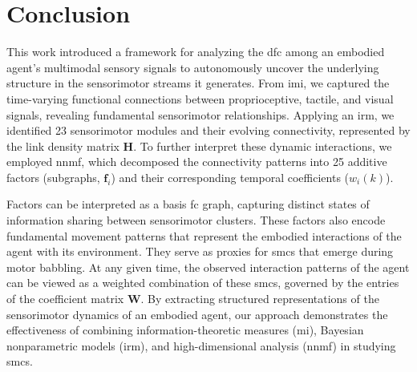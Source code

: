 \documentclass[letterpaper, 10 pt, conference]{ieeeconf}  %
\begin{document}
\section{Conclusion}
This work introduced a framework for analyzing the \acl{dfc} among an embodied agent's multimodal sensory signals to autonomously uncover the underlying structure in the sensorimotor streams it generates. 
From \acl{imi}, we captured the time-varying functional connections between proprioceptive, tactile, and visual signals, revealing fundamental sensorimotor relationships. 
Applying an \acl{irm}, we identified 23 sensorimotor modules and their evolving connectivity, represented by the link density matrix $\bm{H}$. 
To further interpret these dynamic interactions, we employed \acl{nnmf}, which decomposed the connectivity patterns into 25 additive factors (subgraphs, $\bm{f}_i$) and their corresponding temporal coefficients ($w_i(k)$).

Factors can be interpreted as a basis \ac{fc} graph, capturing distinct states of information sharing between sensorimotor clusters. These factors also encode fundamental movement patterns that represent the embodied interactions of the agent with its environment. They serve as proxies for \acp{smc} that emerge during motor babbling. At any given time, the observed interaction patterns of the agent can be viewed as a weighted combination of these \acp{smc}, governed by the entries of the coefficient matrix $\bm{W}$. By extracting structured representations of the sensorimotor dynamics of an embodied agent, our approach demonstrates the effectiveness of combining information-theoretic measures (\ac{mi}), Bayesian nonparametric models (\ac{irm}), and high-dimensional analysis (\ac{nnmf}) in studying \acp{smc}.

\end{document}
